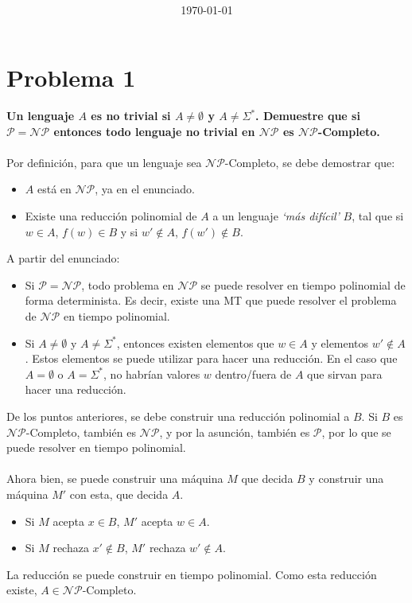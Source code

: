 \documentclass{article}
\title{\task \\ {\normalsize \class \\ \institution \\}}
\author{\me}
\date{\today}
\def\P{\mathcal{P}}
\def\NP{\mathcal{NP}}
\begin{document}
\maketitle
\newpage
\tableofcontents
\newpage

\section{Problema 1}
\textbf{Un lenguaje $A$ es no trivial si $A\neq\emptyset$ y $A\neq\Sigma^{*}$. Demuestre que si $\P = \NP$ entonces todo lenguaje no trivial en $\NP$ es $\NP$-Completo.}
\\\\
Por definición, para que un lenguaje sea $\NP$-Completo, se debe demostrar que:
\begin{itemize}
	\item $A$ está en $\NP$, ya en el enunciado.
	\item Existe una reducción polinomial de $A$ a un lenguaje \textit{`más difícil'} $B$, tal que si $w \in A$, $f(w) \in B$ y si $w' \notin A$, $f(w') \notin B$.
\end{itemize}

A partir del enunciado: 
\begin{itemize}
	\item Si $\P=\NP$, todo problema en $\NP$ se puede resolver en tiempo polinomial de forma determinista. Es decir, existe una MT que puede resolver el problema de $\NP$ en tiempo polinomial. 
	\item Si $A\neq\emptyset$ y $A\neq\Sigma^{*}$, entonces existen elementos que $w \in A$ y elementos $w' \notin A$. Estos elementos se puede utilizar para hacer una reducción. En el caso que $A=\emptyset$ o $A=\Sigma^*$, no habrían valores $w$ dentro/fuera de $A$ que sirvan para hacer una reducción.
\end{itemize}

De los puntos anteriores, se debe construir una reducción polinomial a $B$. Si $B$ es $\NP$-Completo, también es $\NP$, y por la asunción, también es $\P$, por lo que se puede resolver en tiempo polinomial.
\\\\
Ahora bien, se puede construir una máquina $M$ que decida $B$ y construir una máquina $M'$ con esta, que decida $A$. 
\begin{itemize}
	\item Si $M$ acepta $x \in B$, $M'$ acepta $w \in A$. 
	\item Si $M$ rechaza $x' \notin B$, $M'$ rechaza $w' \notin A$. 
\end{itemize}
La reducción se puede construir en tiempo polinomial. Como esta reducción existe, $A\in\NP$-Completo.
\end{document}
